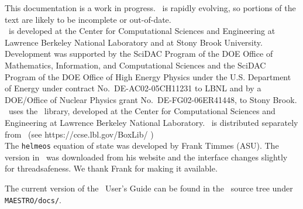 This documentation is a work in progress.  \maestro\ is rapidly
evolving, so portions of the text are likely to be incomplete or
out-of-date. \\

\noindent \maestro\ is developed at the Center for Computational Sciences and
Engineering at Lawrence Berkeley National Laboratory and at Stony
Brook University.  Development was supported by the SciDAC Program of
the DOE Office of Mathematics, Information, and Computational Sciences
and the SciDAC Program of the DOE Office of High Energy Physics under
the U.S. Department of Energy under contract No.\ DE-AC02-05CH11231 to
LBNL and by a DOE/Office of Nuclear Physics grant No.\
DE-FG02-06ER41448, to Stony Brook.  \\

\noindent \maestro\ uses the \boxlib\ library,
developed at the Center for Computational Sciences and
Engineering at Lawrence Berkeley National Laboratory.  \boxlib\
is distributed separately from \maestro\ (see https:/\hspace{-0.25em}/ccse.lbl.gov/BoxLib/ )
\\

\noindent The {\tt helmeos} equation of state was developed by Frank Timmes (ASU).
The version in \maestro\ was downloaded from his website and the
interface changes slightly for threadsafeness.  We thank Frank for
making it available.

\noindent The current version of the \maestro\ User's Guide can be found in 
the \maestro\ source tree under {\tt MAESTRO/docs/}.
